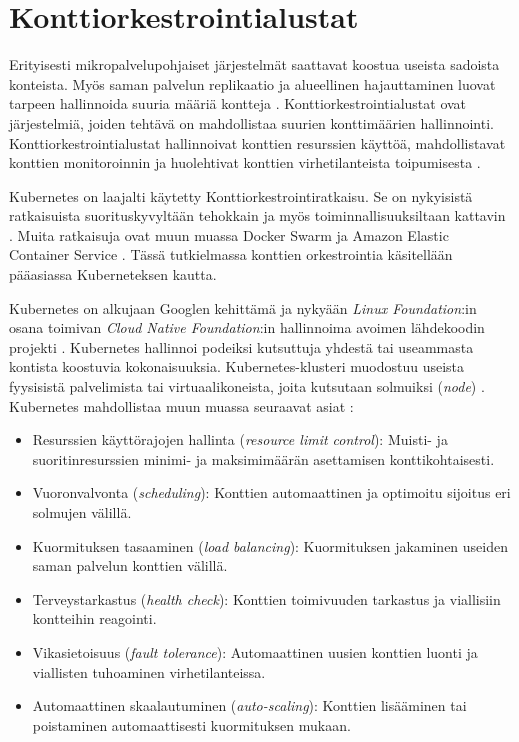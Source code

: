 
\section{Konttiorkestrointialustat\label{platforms}}

Erityisesti mikropalvelupohjaiset järjestelmät saattavat koostua useista sadoista konteista.
Myös saman palvelun replikaatio ja alueellinen hajauttaminen luovat tarpeen hallinnoida suuria määriä kontteja \cite{Khan17}.
Konttiorkestrointialustat ovat järjestelmiä, joiden tehtävä on mahdollistaa suurien konttimäärien hallinnointi.
Konttiorkestrointialustat hallinnoivat konttien resurssien käyttöä, mahdollistavat konttien monitoroinnin ja huolehtivat konttien virhetilanteista toipumisesta \cite{Zhou21}.

Kubernetes on laajalti käytetty Konttiorkestrointiratkaisu.
Se on nykyisistä ratkaisuista suorituskyvyltään tehokkain ja myös toiminnallisuuksiltaan kattavin \cite{Jawarneh19}.
Muita ratkaisuja ovat muun muassa Docker Swarm ja Amazon Elastic Container Service \cite{Khan17}.
Tässä tutkielmassa konttien orkestrointia käsitellään pääasiassa Kuberneteksen kautta.

Kubernetes on alkujaan Googlen kehittämä ja nykyään \textit{Linux Foundation}:in osana toimivan \textit{Cloud Native Foundation}:in hallinnoima avoimen lähdekoodin projekti \cite{Burns22}.
Kubernetes hallinnoi podeiksi kutsuttuja yhdestä tai useammasta kontista koostuvia kokonaisuuksia.
Kubernetes-klusteri muodostuu useista fyysisistä palvelimista tai virtuaalikoneista, joita kutsutaan solmuiksi (\textit{node}) \cite{Medel18}.
Kubernetes mahdollistaa muun muassa seuraavat asiat \cite{Zhou21}:

\begin{itemize}
\item Resurssien käyttörajojen hallinta (\textit{resource limit control}): Muisti- ja suoritinresurssien minimi- ja maksimimäärän asettamisen konttikohtaisesti.
\item Vuoronvalvonta (\textit{scheduling}): Konttien automaattinen ja optimoitu sijoitus eri solmujen välillä.
\item Kuormituksen tasaaminen (\textit{load balancing}): Kuormituksen jakaminen useiden saman palvelun konttien välillä. 
\item Terveystarkastus (\textit{health check}): Konttien toimivuuden tarkastus ja viallisiin kontteihin reagointi.
\item Vikasietoisuus (\textit{fault tolerance}): Automaattinen uusien konttien luonti ja viallisten tuhoaminen virhetilanteissa.
\item Automaattinen skaalautuminen (\textit{auto-scaling}): Konttien lisääminen tai poistaminen automaattisesti kuormituksen mukaan.
\end{itemize}

